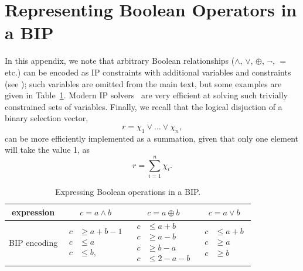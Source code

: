 
\appendix 

\section{Representing Boolean Operators in a BIP}


In this appendix, we note that arbitrary Boolean relationships ($\land$, $\lor$, $\oplus$, $\neg$, $=$ etc.) can be encoded as IP constraints with additional variables and constraints (see \cite{optBook08}); such variables are omitted from the main text, but some examples are given in Table~\ref{table:ops}. %
%
Modern IP solvers~\cite{gurobi} are very efficient at solving such trivially constrained sets of variables.
% 
Finally, we recall that the logical disjuction of a binary selection vector,
%
$$
r = \chi_1 \lor \dots \lor \chi_n,
$$
%
can be more efficiently implemented as a summation, given that only one element will take the value 1, as
%
$$
r = \sum_{i=1}^n \chi_i.
$$
 


\begin{table}[h]
\begin{center}
\caption{Expressing Boolean operations in a BIP.}
\label{table:ops}
\begin{tabular}{|c|c|c|c|} 
  \hline
  \small
expression & $c = a \land b$ &  $c = a \oplus b$ &  $c = a \lor b$ \\
\hline
 \hline
BIP encoding & $\begin{aligned} c &\ge a + b - 1\\ c &\le a\\ c &\le b, \end{aligned}$ &
$\begin{aligned}c &\le a + b\\ c &\ge a-b \\ c &\ge b-a\\ c &\le 2-a-b\end{aligned}$ &
$\begin{aligned}c &\le a + b\\c &\ge a\\c &\ge b\end{aligned}$ \\
 \hline
\end{tabular}
\end{center}
\end{table}




